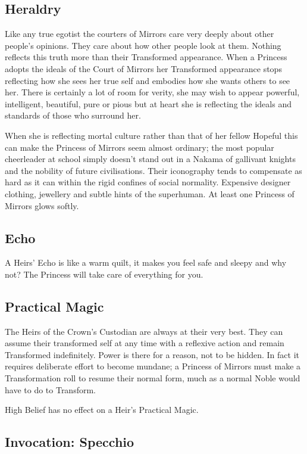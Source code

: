\subsection*{Heraldry}
Like any true egotist the courters of Mirrors care very deeply about other people's opinions. They care about how other people look at them. Nothing reflects this truth more than their Transformed appearance. When a Princess adopts the ideals of the Court of Mirrors her Transformed appearance stops reflecting how she sees her true self and embodies how she wants others to see her. There is certainly a lot of room for verity, she may wish to appear powerful, intelligent, beautiful, pure or pious but at heart she is reflecting the ideals and standards of those who surround her.

When she is reflecting mortal culture rather than that of her fellow Hopeful this can make the Princess of Mirrors seem almost ordinary; the most popular cheerleader at school simply doesn’t stand out in a Nakama of gallivant knights and the nobility of future civilisations. Their iconography tends to compensate as hard as it can within the rigid confines of social normality. Expensive designer clothing, jewellery and subtle hints of the superhuman. At least one Princess of Mirrors glows softly. 


\subsection*{Echo}
A Heirs' Echo is like a warm quilt, it makes you feel safe and sleepy and why not? The Princess will take care of everything for you. 
\subsection*{Practical Magic}
The Heirs of the Crown's Custodian are always at their very best. They can assume their transformed self at any time with a reflexive action and remain Transformed indefinitely. Power is there for a reason, not to be hidden. In fact it requires deliberate effort to become mundane; a Princess of Mirrors must make a Transformation roll to resume their normal form, much as a normal Noble would have to do to Transform. 

High Belief has no effect on a Heir's Practical Magic. 
\subsection*{Invocation: Specchio}

